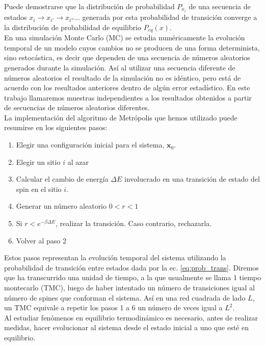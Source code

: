 Puede demostrarse \cite{binder_book2} que la distribución de probabilidad $P_{x_{i}}$ de una secuencia de estados $x_{i}\rightarrow x_{i'}\rightarrow x_{i''} \ldots${}
 generada por esta probabilidad de transición converge a la distribución de probabilidad de equilibrio $P_{eq}(x)$.\\
En una simulación Monte Carlo (MC) se estudia numéricamente la evolución temporal de un modelo cuyos cambios no se producen de una forma determinista,
 sino estocástica, es decir que dependen de una secuencia de números aleatorios generados durante la simulación. Así al utilizar
 una secuencia diferente de números aleatorios el resultado de la simulación no es idéntico, pero está de acuerdo con los resultados anteriores
 dentro de algún error estadístico. En este trabajo llamaremos muestras independientes a los resultados obtenidos a partir de secuencias de números
 aleatorios diferentes.\\
La implementación del algoritmo de Metrópolis que hemos utilizado puede resumirse en los siguientes pasos:

\begin{enumerate}
\item Elegir una configuración inicial para el sistema, $\mathbf{x}_0$.
\item Elegir un sitio $i$ al azar
\item Calcular el cambio de energía $\Delta E$ involucrado en una transición de estado del spin en el sitio $i$. 
\item Generar un número aleatorio $0<r<1$
\item Si $r<e^{-\beta \Delta E}$, realizar la transición. Caso contrario, rechazarla.
\item Volver al paso 2
\end{enumerate}


Estos pasos representan la evolución temporal del sistema utilizando la probabilidad de transición entre estados dada por la ec. \ref{eq:prob_trans}.
Diremos que ha transcurrido una unidad de tiempo, a la que usualmente se llama 1 tiempo montecarlo (TMC), luego de haber intentado un número de transiciones igual
 al número de spines que conforman el sistema. Así en una red cuadrada de lado $L$, un TMC equivale a repetir los pasos 1 a 6 un número de veces
 igual a $L^{2}$.\\
Al estudiar fenómenos en equilibrio termodinámico es necesario, antes de realizar medidas, hacer evolucionar al sistema desde el estado inicial a uno que esté
 en equilibrio.\\

